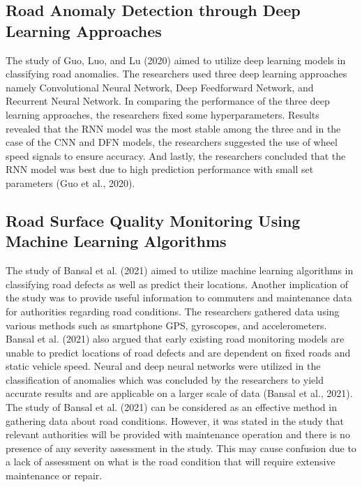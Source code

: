 \documentclass{report} %
\begin{document}
	
	\subsection{Road Anomaly Detection through Deep Learning Approaches}
		The study of Guo, Luo, and Lu (2020) aimed to utilize deep learning models in classifying road anomalies. The researchers used three deep learning approaches namely Convolutional Neural Network, Deep Feedforward Network, and Recurrent Neural Network. In comparing the performance of the three deep learning approaches, the researchers fixed some hyperparameters. Results revealed that the RNN model was the most stable among the three and in the case of the CNN and DFN models, the researchers suggested the use of wheel speed signals to ensure accuracy. And lastly, the researchers concluded that the RNN model was best due to high prediction performance with small set parameters (Guo et al., 2020).

	
	\subsection{Road Surface Quality Monitoring Using Machine Learning Algorithms}
		The study of Bansal et al. (2021) aimed to utilize machine learning algorithms in classifying road defects as well as predict their locations. Another implication of the study was to provide useful information to commuters and maintenance data for authorities regarding road conditions. The researchers gathered data using various methods such as smartphone GPS, gyroscopes, and accelerometers. Bansal et al. (2021) also argued that early existing road monitoring models are unable to predict locations of road defects and are dependent on fixed roads and static vehicle speed.  Neural and deep neural networks were utilized in the classification of anomalies which was concluded by the researchers to yield accurate results and are applicable on a larger scale of data (Bansal et al., 2021). The study of Bansal et al. (2021) can be considered as an effective method in gathering data about road conditions. However, it was stated in the study that relevant authorities will be provided with maintenance operation and there is no presence of any severity assessment in the study. This may cause confusion due to a lack of assessment on what is the road condition that will require extensive maintenance or repair.

	
\end{document}
